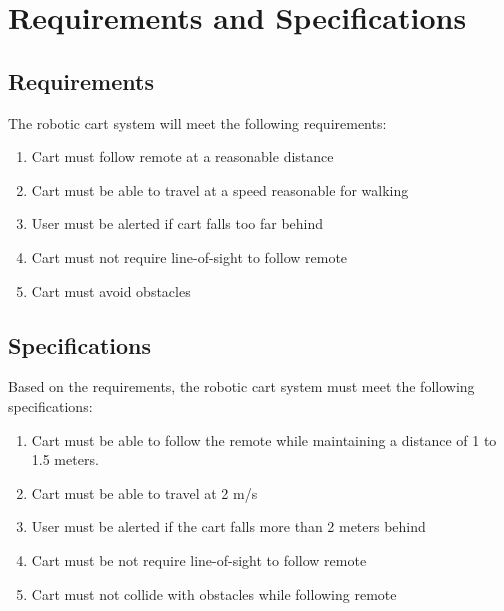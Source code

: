 \documentclass[12pt]{article} %
\begin{document}
\section{Requirements and Specifications}
\subsection{Requirements}
The robotic cart system will meet the following requirements:
\begin{enumerate}
    \item Cart must follow remote at a reasonable distance
    \item Cart must be able to travel at a speed reasonable for walking
    \item User must be alerted if cart falls too far behind
    \item Cart must not require line-of-sight to follow remote
    \item Cart must avoid obstacles
\end{enumerate}

\subsection{Specifications}
Based on the requirements, the robotic cart system must meet the following specifications:
\begin{enumerate}
    \item Cart must be able to follow the remote while maintaining a distance of 1 to 1.5 meters.
    \item Cart must be able to travel at 2 m/s
    \item User must be alerted if the cart falls more than 2 meters behind
    \item Cart must be not require line-of-sight to follow remote
    \item Cart must not collide with obstacles while following remote
\end{enumerate}



\end{document}
